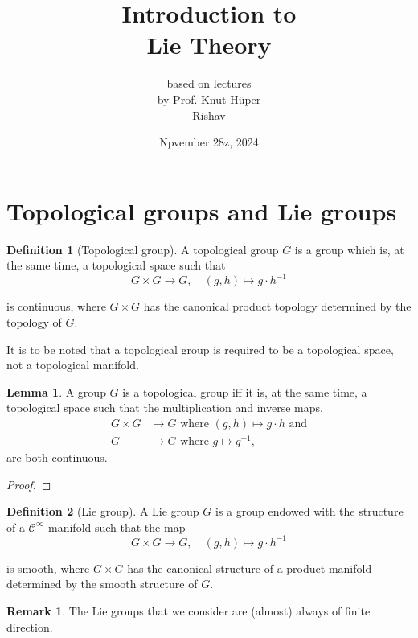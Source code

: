 \documentclass{article}
\title{Introduction to\\Lie Theory}
\author{based on lectures\\by Prof. Knut Hüper\vspace{1.5in}\\Rishav}
\date{Npvember 28z, 2024}
\theoremstyle{definition}
\newtheorem{definition}{Definition}[section]
\newtheorem{lemma}{Lemma}[section]
\newtheorem{remark}{Remark}[section]
\begin{document}
\maketitle

\newpage
\tableofcontents
\newpage

\section{Topological groups and Lie groups}

\begin{definition}[Topological group]
  A topological group $G$ is a group which is, at the same time, a topological space such that
$$
G\times G\to G,\quad(g,h)\mapsto g\cdot h^{-1}
$$

is continuous, where $G\times G$ has the canonical product topology determined by the topology of $G$.
\end{definition}

It is to be noted that a topological group is required to be a topological space, not a topological manifold.

\begin{lemma}
  A group $G$ is a topological group iff it is, at the same time, a topological space such that the multiplication and inverse maps,
  \begin{equation*}
    \begin{split}
      G\times G&\to G\text{ where }(g,h)\mapsto g\cdot h\text{ and}\\
      G&\to G\text{ where }g\mapsto g^{-1},
    \end{split}
  \end{equation*}
  are both continuous.
\end{lemma}

\begin{proof}
\end{proof}

\begin{definition}[Lie group]
  A Lie group $G$ is a group endowed with the structure of a $\mathcal{C}^{\infty}$ manifold such that the map
  $$
  G\times G\to G,\quad(g,h)\mapsto g\cdot h^{-1}
  $$

  is smooth, where $G\times G$ has the canonical structure of a product manifold determined by the smooth structure of $G$.
\end{definition}

\begin{remark}
  The Lie groups that we consider are (almost) always of finite direction.
\end{remark}
\end{document}
